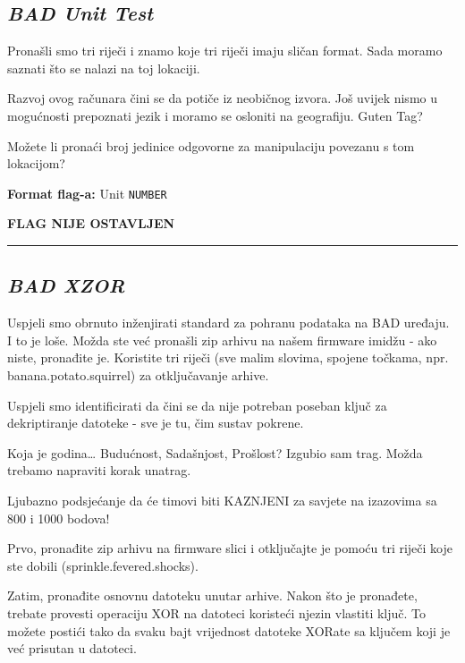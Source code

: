 \documentclass{article}
\begin{document}
\subsection{\textit{BAD Unit Test}}
\begin{tcolorbox}[
    colback=gray!5,  %
    colframe=gray!75,  %
    title=\textbf{Zadatak}]
    Pronašli smo tri riječi i znamo koje tri riječi imaju sličan format. Sada moramo saznati što se nalazi na toj lokaciji.

    Razvoj ovog računara čini se da potiče iz neobičnog izvora. Još uvijek nismo u mogućnosti prepoznati jezik i moramo se osloniti na geografiju. Guten Tag?

    Možete li pronaći broj jedinice odgovorne za manipulaciju povezanu s tom lokacijom?
    
    \textbf{Format flag-a:} Unit \texttt{NUMBER}
\end{tcolorbox}

\begin{center}
    \textbf{FLAG NIJE OSTAVLJEN}
\end{center}

\noindent\rule{\textwidth}{0.4pt}

\subsection{\textit{BAD XZOR}}
\begin{tcolorbox}[
    colback=gray!5,  %
    colframe=gray!75,  %
    title=\textbf{Zadatak}]
    Uspjeli smo obrnuto inženjirati standard za pohranu podataka na BAD uređaju. I to je loše. Možda ste već pronašli zip arhivu na našem firmware imidžu - ako niste, pronađite je. Koristite tri riječi (sve malim slovima, spojene točkama, npr. banana.potato.squirrel) za otključavanje arhive.

    Uspjeli smo identificirati da čini se da nije potreban poseban ključ za dekriptiranje datoteke - sve je tu, čim sustav pokrene.

    Koja je godina… Budućnost, Sadašnjost, Prošlost? Izgubio sam trag. Možda trebamo napraviti korak unatrag.

    Ljubazno podsjećanje da će timovi biti KAZNJENI za savjete na izazovima sa 800 i 1000 bodova!
\end{tcolorbox}
    Prvo, pronađite zip arhivu na firmware slici i otključajte je pomoću tri riječi koje ste dobili (sprinkle.fevered.shocks).

    Zatim, pronađite osnovnu datoteku unutar arhive. Nakon što je pronađete, trebate provesti operaciju XOR na datoteci koristeći njezin vlastiti ključ. To možete postići tako da svaku bajt vrijednost datoteke XORate sa ključem koji je već prisutan u datoteci.
\end{document}
